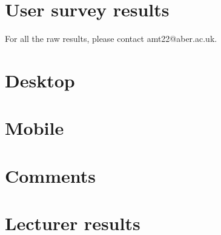 \chapter{User survey results}
\label{appendix:user-results}
For all the raw results, please contact amt22@aber.ac.uk.
\chapter{Desktop}
\chapter{Mobile}
\chapter{Comments} 
\chapter{Lecturer results}